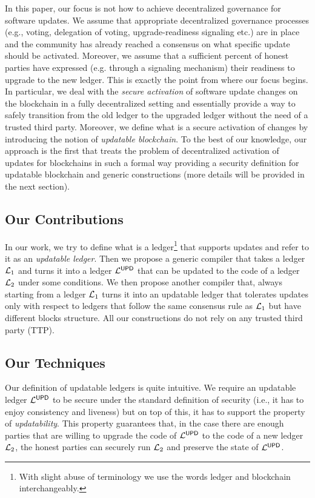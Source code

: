 In this paper, our focus is not how to achieve decentralized governance for 
software updates. 
We assume that appropriate decentralized governance processes (e.g., voting, 
delegation of voting, upgrade-readiness signaling etc.) are in place and the 
community has already reached a 
consensus on what specific update should be activated. Moreover, we assume that 
a sufficient percent of honest parties have expressed (e.g. through a signaling 
mechanism) their readiness to upgrade to the new ledger. This is exactly the 
point from where our focus begins. In particular, we deal with the \emph{secure 
activation} of software update changes on the blockchain in a fully 
decentralized setting and essentially 
provide a way to safely transition from the old ledger to the upgraded ledger 
without the need of a trusted third party. Moreover, we define what is a secure 
activation of changes by introducing the notion of \emph{updatable blockchain}. 
To the best of our knowledge, our approach is the first that treats the problem 
of decentralized activation of updates for blockchains in such a formal way 
providing a security definition for updatable blockchain and generic 
constructions (more details will be provided in the next section).


\subsection{Our Contributions}
In our work, we try to define what is a ledger\footnote{With slight abuse of terminology we use the words 
ledger and blockchain interchangeably.} that supports updates and refer to it as an \emph{updatable ledger}.
Then we propose a generic compiler that takes a ledger $\mathcal{L}_1$ and turns it into a ledger $\mathcal{L}^\mathsf{UPD}$
that can be updated to the code of a ledger $\mathcal{L}_2$ under some conditions.
We then propose another compiler that, always starting from a ledger $\mathcal{L}_1$ turns it into an updatable ledger that tolerates updates only with respect to ledgers that follow the same consensus rule as $\mathcal{L}_1$ but have different blocks structure. All our constructions do not rely on any trusted third party (TTP).

\subsection{Our Techniques} Our definition of updatable ledgers is quite intuitive. We require
an updatable ledger $\mathcal{L}^\mathsf{UPD}$ to be secure under the standard definition of security (i.e., it has to enjoy consistency and liveness) but on top of this, it has to support the property of \emph{updatability}. 
This property guarantees that, in the case there are  enough parties that are willing to upgrade 
the code of $\mathcal{L}^\mathsf{UPD}$ to the code of a new ledger $\mathcal{L}_2$, the honest parties can securely run $\mathcal{L}_2$
and preserve the state of $\mathcal{L}^\mathsf{UPD}$.

